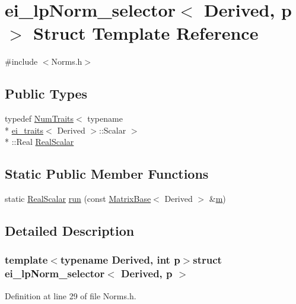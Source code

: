 \hypertarget{structei__lp_norm__selector}{\section{ei\-\_\-lp\-Norm\-\_\-selector$<$ Derived, p $>$ Struct Template Reference}
\label{structei__lp_norm__selector}
}


{\ttfamily \#include $<$Norms.\-h$>$}

\subsection*{Public Types}
\begin{DoxyCompactItemize}
\item 
typedef \hyperlink{struct_num_traits}{Num\-Traits}$<$ typename \\*
\hyperlink{structei__traits}{ei\-\_\-traits}$<$ Derived $>$\-::Scalar $>$\\*
\-::Real \hyperlink{structei__lp_norm__selector_a0b357dbaf98a49886af0d992b7be2bff}{Real\-Scalar}
\end{DoxyCompactItemize}
\subsection*{Static Public Member Functions}
\begin{DoxyCompactItemize}
\item 
static \hyperlink{structei__lp_norm__selector_a0b357dbaf98a49886af0d992b7be2bff}{Real\-Scalar} \hyperlink{structei__lp_norm__selector_a17578dc7aa9395be5c8449ca296bbc61}{run} (const \hyperlink{class_matrix_base}{Matrix\-Base}$<$ Derived $>$ \&\hyperlink{glext_8h_af593500c283bf1a787a6f947f503a5c2}{m})
\end{DoxyCompactItemize}


\subsection{Detailed Description}
\subsubsection*{template$<$typename Derived, int p$>$struct ei\-\_\-lp\-Norm\-\_\-selector$<$ Derived, p $>$}



Definition at line 29 of file Norms.\-h.



